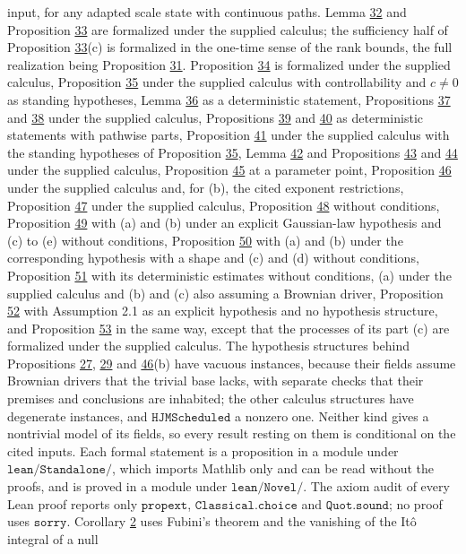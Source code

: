 \documentclass[11pt]{article}
\begin{document}
input, for any adapted scale state with continuous paths. Lemma \hyperref[res:Lemma-32]{32} and Proposition \hyperref[res:Proposition-33]{33} are formalized under the supplied calculus; the sufficiency half of Proposition \hyperref[res:Proposition-33]{33}(c) is formalized in the one-time sense of the rank bounds, the full realization being Proposition \hyperref[res:Proposition-31]{31}. Proposition \hyperref[res:Proposition-34]{34} is formalized under the supplied calculus, Proposition \hyperref[res:Proposition-35]{35} under the supplied calculus with controllability and \(c\neq0\) as standing hypotheses, Lemma \hyperref[res:Lemma-36]{36} as a deterministic statement, Propositions \hyperref[res:Proposition-37]{37} and \hyperref[res:Proposition-38]{38} under the supplied calculus, Propositions \hyperref[res:Proposition-39]{39} and \hyperref[res:Proposition-40]{40} as deterministic statements with pathwise parts, Proposition \hyperref[res:Proposition-41]{41} under the supplied calculus with the standing hypotheses of Proposition \hyperref[res:Proposition-35]{35}, Lemma \hyperref[res:Lemma-42]{42} and Propositions \hyperref[res:Proposition-43]{43} and \hyperref[res:Proposition-44]{44} under the supplied calculus, Proposition \hyperref[res:Proposition-45]{45} at a parameter point, Proposition \hyperref[res:Proposition-46]{46} under the supplied calculus and, for (b), the cited exponent restrictions, Proposition \hyperref[res:Proposition-47]{47} under the supplied calculus, Proposition \hyperref[res:Proposition-48]{48} without conditions, Proposition \hyperref[res:Proposition-49]{49} with (a) and (b) under an explicit Gaussian-law hypothesis and (c) to (e) without conditions, Proposition \hyperref[res:Proposition-50]{50} with (a) and (b) under the corresponding hypothesis with a shape and (c) and (d) without conditions, Proposition \hyperref[res:Proposition-51]{51} with its deterministic estimates without conditions, (a) under the supplied calculus and (b) and (c) also assuming a Brownian driver, Proposition \hyperref[res:Proposition-52]{52} with Assumption 2.1 as an explicit hypothesis and no hypothesis structure, and Proposition \hyperref[res:Proposition-53]{53} in the same way, except that the processes of its part (c) are formalized under the supplied calculus. The hypothesis structures behind Propositions \hyperref[res:Proposition-27]{27}, \hyperref[res:Proposition-29]{29} and \hyperref[res:Proposition-46]{46}(b) have vacuous instances, because their fields assume Brownian drivers that the trivial base lacks, with separate checks that their premises and conclusions are inhabited; the other calculus structures have degenerate instances, and \(\texttt{HJMScheduled}\) a nonzero one. Neither kind gives a nontrivial model of its fields, so every result resting on them is conditional on the cited inputs. Each formal statement is a proposition in a module under \(\texttt{lean/Standalone/}\), which imports Mathlib only and can be read without the proofs, and is proved in a module under \(\texttt{lean/Novel/}\). The axiom audit of every Lean proof reports only \(\texttt{propext}\), \(\texttt{Classical.choice}\) and \(\texttt{Quot.sound}\); no proof uses \(\texttt{sorry}\). Corollary \hyperref[res:Corollary-2]{2} uses Fubini's theorem and the vanishing of the Itô integral of a null 
\end{document}
